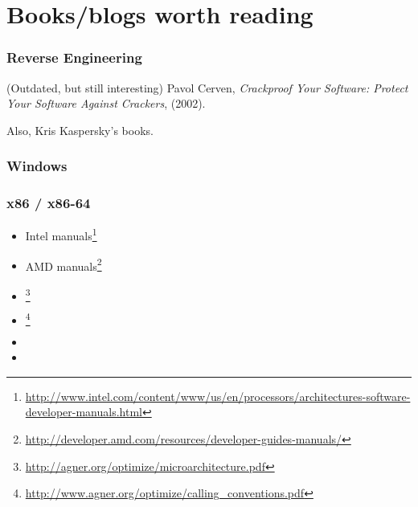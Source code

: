 \chapter{Books/blogs worth reading}


\subsection{Reverse Engineering}



(Outdated, but still interesting) Pavol Cerven, \emph{Crackproof Your Software: Protect Your Software Against Crackers}, (2002).

Also, Kris Kaspersky's books.

\subsection{Windows}



\subsection{\CCpp}



\subsection{x86 / x86-64}

\label{x86_manuals}
\begin{itemize}
\item Intel manuals\footnote{\AlsoAvailableAs \url{http://www.intel.com/content/www/us/en/processors/architectures-software-developer-manuals.html}}

\item AMD manuals\footnote{\AlsoAvailableAs \url{http://developer.amd.com/resources/developer-guides-manuals/}}

\item \AgnerFog{}\footnote{\AlsoAvailableAs \url{http://agner.org/optimize/microarchitecture.pdf}}

\item \AgnerFogCC{}\footnote{\AlsoAvailableAs \url{http://www.agner.org/optimize/calling_conventions.pdf}}

\item \IntelOptimization

\item \AMDOptimization
\end{itemize}


